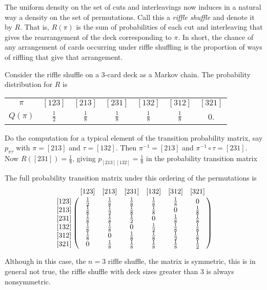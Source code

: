 \documentclass[12pt]{article}
\begin{document}
The uniform density on the set of cuts and interleavings now induces in
a natural way a density on the set of permutations.  Call this a \emph{riffle
shuffle} and denote it by \( R \).  That is, \( R(\pi) \) is the sum of
probabilities of each cut and interleaving that gives the rearrangement
of the deck corresponding to \( \pi \).  In short, the chance of any
arrangement of cards occurring under riffle shuffling is the proportion
of ways of riffling that give that arrangement.

\begin{example}
    Consider the riffle shuffle on a \( 3 \)-card deck as a Markov
    chain. The probability distribution for \( R \) is \\
    \begin{tabular}{ccccccc}
        $\pi$    & $[123]$       & $[213]$       & $[231]$       & $[132]$       & $[312]$       & $[321]$ \\ 
        $Q(\pi)$ & $\frac{1}{2}$ & $\frac{1}{8}$ & $\frac{1}{8}$ & $\frac{1}{8}$ & $\frac{1}{8}$ & 0.      \\ 
    \end{tabular}

    Do the computation for a typical element of the transition
    probability matrix, say \( p_{\pi \tau} \) with \( \pi = [213] \)
    and \( \tau = [132] \). Then \( \pi^{-1} = [213] \) and \( \pi^{-1}
    \circ \tau = [231] \).  Now \( R([231]) = \frac{1}{8} \), giving \(
    p_{[213] [132]} = \frac{1}{8} \) in the probability transition
    matrix

    The full probability transition matrix under this ordering of the
    permutations is
    \[
        \bordermatrix{
            & [123]      & [213]      & [231]       & [132]       & [312]       & [321] \cr
       [123]& \frac{1}{2}& \frac{1}{8}& \frac{1}{8} & \frac{1}{8} & \frac{1}{8} & 0 \cr
       [213]& \frac{1}{8}& \frac{1}{2}& \frac{1}{8} & \frac{1}{8} & 0           & \frac{1}{8} \cr
       [231]& \frac{1}{8}& \frac{1}{8}& \frac{1}{2} & 0           & \frac{1}{8} & \frac{1}{8} \cr
       [132]& \frac{1}{8}& \frac{1}{8}& 0           & \frac{1}{2} & \frac{1}{8} & \frac{1}{8} \cr
       [312]& \frac{1}{8}& 0          & \frac{1}{8} & \frac{1}{8} & \frac{1}{2} & \frac{1}{8} \cr
       [321]& 0          & \frac{1}{8}& \frac{1}{8} & \frac{1}{8} & \frac{1}{8} & \frac{1}{2} \cr
        }
    \]

    Although in this case, the \( n=3 \) riffle shuffle, the matrix is
    symmetric, this is in general not true, the riffle shuffle with deck
    sizes greater than \( 3 \) is always nonsymmetric.
\end{example}
\end{document}

